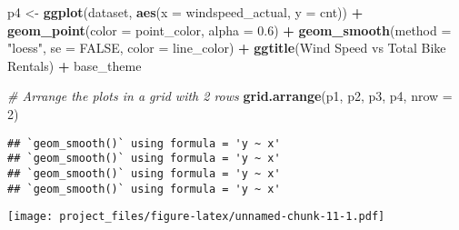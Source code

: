 \documentclass[
]{article}
\newenvironment{Shaded}{\begin{snugshade}}{\end{snugshade}}
\newcommand{\AttributeTok}[1]{\textcolor[rgb]{0.13,0.29,0.53}{#1}}
\newcommand{\CommentTok}[1]{\textcolor[rgb]{0.56,0.35,0.01}{\textit{#1}}}
\newcommand{\ConstantTok}[1]{\textcolor[rgb]{0.56,0.35,0.01}{#1}}
\newcommand{\DecValTok}[1]{\textcolor[rgb]{0.00,0.00,0.81}{#1}}
\newcommand{\FloatTok}[1]{\textcolor[rgb]{0.00,0.00,0.81}{#1}}
\newcommand{\FunctionTok}[1]{\textcolor[rgb]{0.13,0.29,0.53}{\textbf{#1}}}
\newcommand{\NormalTok}[1]{#1}
\newcommand{\OtherTok}[1]{\textcolor[rgb]{0.56,0.35,0.01}{#1}}
\newcommand{\SpecialCharTok}[1]{\textcolor[rgb]{0.81,0.36,0.00}{\textbf{#1}}}
\newcommand{\StringTok}[1]{\textcolor[rgb]{0.31,0.60,0.02}{#1}}
\begin{document}
\begin{Shaded}
\begin{Highlighting}[]
\NormalTok{p4 }\OtherTok{\textless{}{-}} \FunctionTok{ggplot}\NormalTok{(dataset, }\FunctionTok{aes}\NormalTok{(}\AttributeTok{x =}\NormalTok{ windspeed\_actual, }\AttributeTok{y =}\NormalTok{ cnt)) }\SpecialCharTok{+} 
      \FunctionTok{geom\_point}\NormalTok{(}\AttributeTok{color =}\NormalTok{ point\_color, }\AttributeTok{alpha =} \FloatTok{0.6}\NormalTok{) }\SpecialCharTok{+} 
      \FunctionTok{geom\_smooth}\NormalTok{(}\AttributeTok{method =} \StringTok{"loess"}\NormalTok{, }\AttributeTok{se =} \ConstantTok{FALSE}\NormalTok{, }\AttributeTok{color =}\NormalTok{ line\_color) }\SpecialCharTok{+} 
      \FunctionTok{ggtitle}\NormalTok{(}\StringTok{\textquotesingle{}Wind Speed vs Total Bike Rentals\textquotesingle{}}\NormalTok{) }\SpecialCharTok{+}
\NormalTok{      base\_theme}

\CommentTok{\# Arrange the plots in a grid with 2 rows}
\FunctionTok{grid.arrange}\NormalTok{(p1, p2, p3, p4, }\AttributeTok{nrow =} \DecValTok{2}\NormalTok{)}
\end{Highlighting}
\end{Shaded}

\begin{verbatim}
## `geom_smooth()` using formula = 'y ~ x'
## `geom_smooth()` using formula = 'y ~ x'
## `geom_smooth()` using formula = 'y ~ x'
## `geom_smooth()` using formula = 'y ~ x'
\end{verbatim}

\texttt{[image: project\_files/figure-latex/unnamed-chunk-11-1.pdf]}
\end{document}
